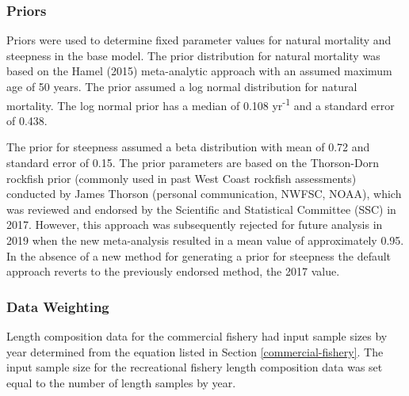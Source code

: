 \documentclass[11pt,
  english,
  a4paper,
]{article}
\begin{document}
\hypertarget{priors}{%
\subsubsection{Priors}\label{priors}}

\leavevmode\tagmcend\tagstructend


Priors were used to determine fixed parameter values for natural mortality and steepness in the base model. The prior distribution for natural mortality was based on the Hamel {(2015)\leavevmode\tagmcend\tagstructend} meta-analytic approach with an assumed maximum age of 50 years. The prior assumed a log normal distribution for natural mortality. The log normal prior has a median of 0.108 yr\textsuperscript{-1} and a standard error of 0.438.

\leavevmode\tagmcend\tagstructend\par


The prior for steepness assumed a beta distribution with mean of 0.72 and standard error of 0.15. The prior parameters are based on the Thorson-Dorn rockfish prior (commonly used in past West Coast rockfish assessments) conducted by James Thorson (personal communication, NWFSC, NOAA), which was reviewed and endorsed by the Scientific and Statistical Committee (SSC) in 2017. However, this approach was subsequently rejected for future analysis in 2019 when the new meta-analysis resulted in a mean value of approximately 0.95. In the absence of a new method for generating a prior for steepness the default approach reverts to the previously endorsed method, the 2017 value.

\leavevmode\tagmcend\tagstructend\par


\hypertarget{data-weighting}{%
\subsubsection{Data Weighting}\label{data-weighting}}

\leavevmode\tagmcend\tagstructend


Length composition data for the commercial fishery had input sample sizes by year determined from the equation listed in Section \ref{commercial-fishery}. The input sample size for the recreational fishery length composition data was set equal to the number of length samples by year.
\end{document}
